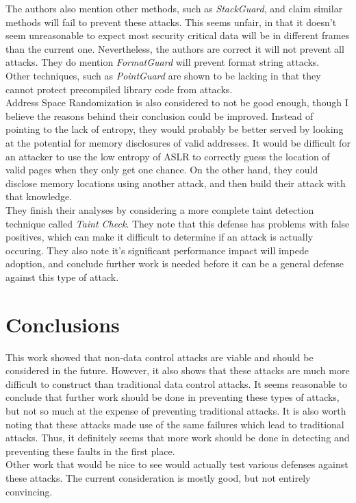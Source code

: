 \documentclass{article}
\begin{document}
The authors also mention other methods, such as {\it StackGuard}, and claim similar methods will fail to prevent these attacks.
This seems unfair, in that it doesn't seem unreasonable to expect most security critical data will be in different frames than the current one.
Nevertheless, the authors are correct it will not prevent all attacks.
They do mention {\it FormatGuard} will prevent format string attacks.\\
Other techniques, such as {\it PointGuard} are shown to be lacking in that they cannot protect precompiled library code from attacks.\\
Address Space Randomization is also considered to not be good enough,
though I believe the reasons behind their conclusion could be improved.
Instead of pointing to the lack of entropy,
they would probably be better served by looking at the potential for memory disclosures of valid addresses.
It would be difficult for an attacker to use the low entropy of ASLR to correctly guess the location of valid pages when they only get one chance.
On the other hand, they could disclose memory locations using another attack,
and then build their attack with that knowledge.\\
They finish their analyses by considering a more complete taint detection technique called {\it Taint Check}.
They note that this defense has problems with false positives,
which can make it difficult to determine if an attack is actually occuring.
They also note it's significant performance impact will impede adoption,
and conclude further work is needed before it can be a general defense against this type of attack.
\section{Conclusions}
This work showed that non-data control attacks are viable and should be considered in the future.
However, it also shows that these attacks are much more difficult to construct than traditional data control attacks.
It seems reasonable to conclude that further work should be done in preventing these types of attacks,
but not so much at the expense of preventing traditional attacks.
It is also worth noting that these attacks made use of the same failures which lead to traditional attacks.
Thus, it definitely seems that more work should be done in detecting and preventing these faults in the first place.\\
Other work that would be nice to see would actually test various defenses against these attacks.
The current consideration is mostly good, but not entirely convincing.
\end{document}
